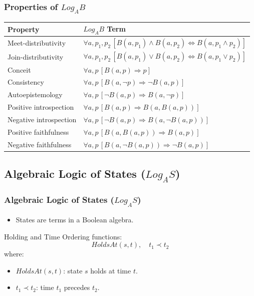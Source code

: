 \documentclass[aspectratio=169]{beamer}
\begin{document}
\begin{frame}
\frametitle{Properties of $Log_AB$}
\centering
{\small
\renewcommand{\arraystretch}{1.5}
\begin{tabular}{|p{4cm}|p{9.5cm}|}
    \hline
    \textbf{Property} & \textbf{$Log_AB$ Term} \\
    \hline
    Meet-distributivity & $\forall a, p_1, p_2\,[B(a, p_1) \wedge B(a, p_2) \Leftrightarrow B(a, p_1 \wedge p_2)]$ \\
    \hline
    Join-distributivity & $\forall a, p_1, p_2\,[B(a, p_1) \vee B(a, p_2) \Leftrightarrow B(a, p_1 \vee p_2)]$ \\
    \hline
    Conceit & $\forall a, p\,[B(a, p) \Rightarrow p]$ \\
    \hline
    Consistency & $\forall a, p\,[B(a, \neg p) \Rightarrow \neg B(a, p)]$ \\
    \hline
    Autoepistemology & $\forall a, p\,[\neg B(a, p) \Rightarrow B(a, \neg p)]$ \\
    \hline
    Positive introspection & $\forall a, p\,[B(a, p) \Rightarrow B(a, B(a, p))]$ \\
    \hline
    Negative introspection & $\forall a, p\,[\neg B(a, p) \Rightarrow B(a, \neg B(a, p))]$ \\
    \hline
    Positive faithfulness & $\forall a, p\,[B(a, B(a, p)) \Rightarrow B(a, p)]$ \\
    \hline
    Negative faithfulness & $\forall a, p\,[B(a, \neg B(a, p)) \Rightarrow \neg B(a, p)]$ \\
    \hline
\end{tabular}
}
\end{frame}

\subsection{Algebraic Logic of States ($Log_AS$)}
\begin{frame}
\frametitle{Algebraic Logic of States ($Log_AS$)}
\Large 
\begin{itemize}
    \item States are terms in a Boolean algebra.
\end{itemize}
\begin{block}{Holding and Time Ordering functions:}
\[
HoldsAt(s, t), \quad t_1 \prec t_2
\]
\normalsize where:
\begin{itemize}
    \item $HoldsAt(s, t)$: state $s$ holds at time $t$.
    \item $t_1 \prec t_2$: time $t_1$ precedes $t_2$.
\end{itemize}
\end{block}
\end{frame}
\end{document}
